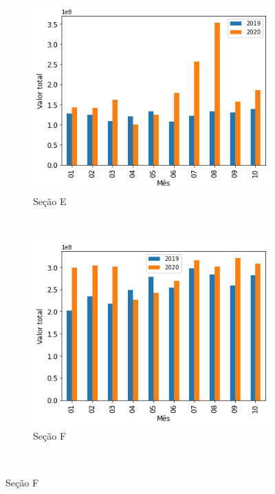 \begin{figure}[htb]
\begin{subfigure}[b]{0.45\textwidth}
        \includegraphics[scale=0.45]{images/base-de-dados-17.E-comparacao-valor-total-por-secao.png}
        \caption{Seção E}
        \label{fig:pandemia:descritiva-17.E-comparacao-valor-total-por-secao}
    \end{subfigure} ~ \quad
    \begin{subfigure}[b]{0.45\textwidth}
        \includegraphics[scale=0.45]{images/base-de-dados-17.F-comparacao-valor-total-por-secao.png}
        \caption{Seção F}
        \label{fig:pandemia:descritiva-17.F-comparacao-valor-total-por-secao}
    \end{subfigure} ~ \\
    \fautor
\end{figure}

